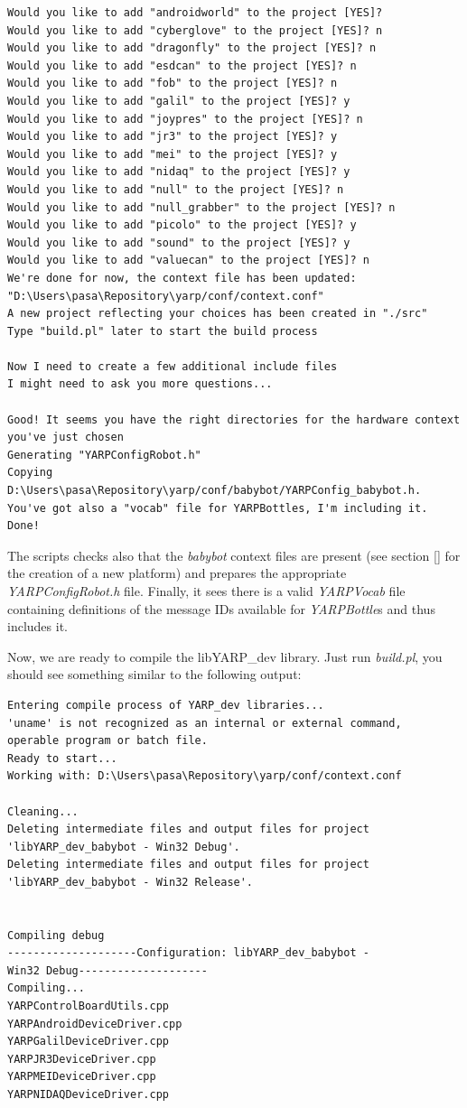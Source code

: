 \begin{verbatim}
Would you like to add "androidworld" to the project [YES]?
Would you like to add "cyberglove" to the project [YES]? n
Would you like to add "dragonfly" to the project [YES]? n
Would you like to add "esdcan" to the project [YES]? n
Would you like to add "fob" to the project [YES]? n
Would you like to add "galil" to the project [YES]? y
Would you like to add "joypres" to the project [YES]? n
Would you like to add "jr3" to the project [YES]? y
Would you like to add "mei" to the project [YES]? y
Would you like to add "nidaq" to the project [YES]? y
Would you like to add "null" to the project [YES]? n
Would you like to add "null_grabber" to the project [YES]? n
Would you like to add "picolo" to the project [YES]? y
Would you like to add "sound" to the project [YES]? y
Would you like to add "valuecan" to the project [YES]? n
We're done for now, the context file has been updated: 
"D:\Users\pasa\Repository\yarp/conf/context.conf"
A new project reflecting your choices has been created in "./src"
Type "build.pl" later to start the build process

Now I need to create a few additional include files
I might need to ask you more questions...

Good! It seems you have the right directories for the hardware context 
you've just chosen
Generating "YARPConfigRobot.h"
Copying D:\Users\pasa\Repository\yarp/conf/babybot/YARPConfig_babybot.h.
You've got also a "vocab" file for YARPBottles, I'm including it.
Done!
\end{verbatim}

The scripts checks also that the {\em babybot} context files are present (see section \ref{} for the creation of a new platform) and prepares the appropriate {\em YARPConfigRobot.h} file. Finally, it sees there is a valid {\em YARPVocab} file containing definitions of the message IDs available for {\em YARPBottle}s and thus includes it.

Now, we are ready to compile the libYARP\_dev library. Just run {\em build.pl}, you should see something similar to the following output:

\begin{verbatim}
Entering compile process of YARP_dev libraries...
'uname' is not recognized as an internal or external command,
operable program or batch file.
Ready to start...
Working with: D:\Users\pasa\Repository\yarp/conf/context.conf

Cleaning...
Deleting intermediate files and output files for project 
'libYARP_dev_babybot - Win32 Debug'.
Deleting intermediate files and output files for project 
'libYARP_dev_babybot - Win32 Release'.


Compiling debug
--------------------Configuration: libYARP_dev_babybot - 
Win32 Debug--------------------
Compiling...
YARPControlBoardUtils.cpp
YARPAndroidDeviceDriver.cpp
YARPGalilDeviceDriver.cpp
YARPJR3DeviceDriver.cpp
YARPMEIDeviceDriver.cpp
YARPNIDAQDeviceDriver.cpp
\end{verbatim}

